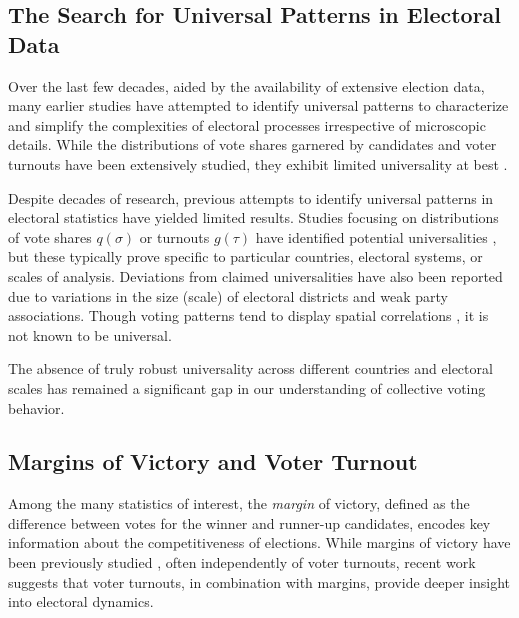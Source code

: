 \subsection{The Search for Universal Patterns in Electoral Data}
Over the last few decades, aided by the availability of extensive election data, many earlier studies \cite{CosAlmAnd1999, ForCas2007, mantovani2011scaling, ChaMitFor2013, BokSzaVat2018, hosel2019universality} have attempted to identify universal patterns to characterize and simplify the complexities of electoral processes irrespective of microscopic details. While the distributions of vote shares garnered by candidates \cite{CalCroAnt2015, BurRanGir2016, MorHisNak2019, Kon2017} and voter turnouts \cite{BorBou2010, BorRayBou2012} have been extensively studied, they exhibit limited universality at best \cite{CosAlmAnd1999, ForCas2007, ChaMitFor2013}.

Despite decades of research, previous attempts to identify universal patterns in electoral statistics have yielded limited results. Studies focusing on distributions of vote shares $q(\sigma)$ or turnouts $g(\tau)$ have identified potential universalities \cite{voting-contagion-modeling-and-analysis-of-a-century, scaling-and-universality-in-proportional-elections}, but these typically prove specific to particular countries, electoral systems, or scales of analysis. Deviations from claimed universalities have also been reported \cite{ChaMitFor2013, Kon2017, Kon2019, CalCroAnt2015, BorRayBou2012} due to variations in the size (scale) of electoral districts and weak party associations. Though voting patterns tend to display spatial correlations \cite{FerSucRam2014, BraDeA2017, MicIlkAtt2021, MorHisNak2019}, it is not known to be universal. 

The absence of truly robust universality across different countries and electoral scales has remained a significant gap in our understanding of collective voting behavior.

\subsection{Margins of Victory and Voter Turnout}
Among the many statistics of interest, the \emph{margin} of victory, defined as the difference between votes for the winner and runner-up candidates, encodes key information about the competitiveness of elections. While margins of victory have been previously studied \cite{jacobson1987marginals, mccrane1997threatening, mulligan2003empirical, magrino2011computing, xia2012computing, bhattacharyya2021predicting}, often independently of voter turnouts, recent work suggests that voter turnouts, in combination with margins, provide deeper insight into electoral dynamics.

